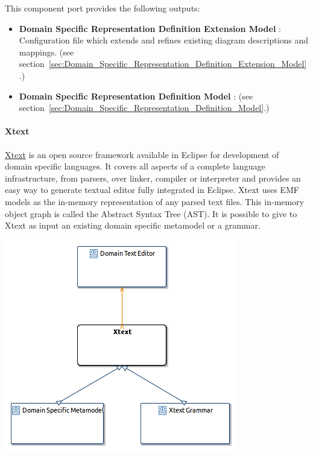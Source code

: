 \documentclass{gemoc} %
\begin{document}
This component port provides the following outputs:
\begin{itemize}
  \item \textbf{Domain Specific Representation Definition Extension Model} :
Configuration file which extends and refines existing diagram descriptions and mappings.
(see section~\ref{sec:Domain_Specific_Representation_Definition_Extension_Model}.)
  \item \textbf{Domain Specific Representation Definition Model} :
(see section~\ref{sec:Domain_Specific_Representation_Definition_Model}.)
\end{itemize}


\paragraph{Xtext}
\label{sec:Xtext}

\href{http://www.eclipse.org/Xtext}{Xtext} is an open source framework available in Eclipse for development of domain specific languages.
It covers all aspects of a complete language infrastructure, from parsers, over linker, compiler or interpreter and provides an easy way to generate textual editor fully integrated in Eclipse.
Xtext uses EMF models as the in-memory representation of any parsed text files. This in-memory object graph is called the Abstract Syntax Tree (AST).
It is possible to give to Xtext as input an existing domain specific metamodel or a grammar.
\begin{center}
\includegraphics*[trim=0.0cm 0.0cm 0cm 0.0cm, clip=true]{../images/generated/Generated_Xtext.png}
\end{center}
\end{document}
